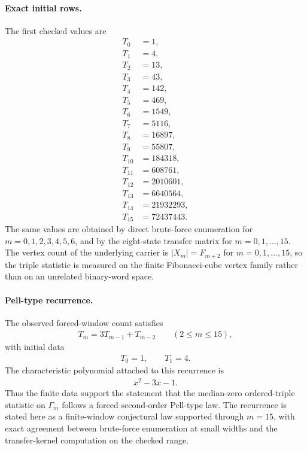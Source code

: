 \paragraph{Exact initial rows.}
The first checked values are
$$
\begin{aligned}
T_0&=1,\\
T_1&=4,\\
T_2&=13,\\
T_3&=43,\\
T_4&=142,\\
T_5&=469,\\
T_6&=1549,\\
T_7&=5116,\\
T_8&=16897,\\
T_9&=55807,\\
T_{10}&=184318,\\
T_{11}&=608761,\\
T_{12}&=2010601,\\
T_{13}&=6640564,\\
T_{14}&=21932293,\\
T_{15}&=72437443.
\end{aligned}
$$
The same values are obtained by direct brute-force enumeration for $m=0,1,2,3,4,5,6$, and by the eight-state transfer matrix for $m=0,1,\ldots,15$. The vertex count of the underlying carrier is $|X_m|=F_{m+2}$ for $m=0,1,\ldots,15$, so the triple statistic is measured on the finite Fibonacci-cube vertex family rather than on an unrelated binary-word space.

\paragraph{Pell-type recurrence.}
The observed forced-window count satisfies
$$
\begin{aligned}
T_m=3T_{m-1}+T_{m-2}\qquad (2\leq m\leq 15),
\end{aligned}
$$
with initial data
$$
\begin{aligned}
T_0=1,\qquad T_1=4.
\end{aligned}
$$
The characteristic polynomial attached to this recurrence is
$$
\begin{aligned}
x^2-3x-1.
\end{aligned}
$$
Thus the finite data support the statement that the median-zero ordered-triple statistic on $\Gamma_m$ follows a forced second-order Pell-type law. The recurrence is stated here as a finite-window conjectural law supported through $m=15$, with exact agreement between brute-force enumeration at small widths and the transfer-kernel computation on the checked range.

